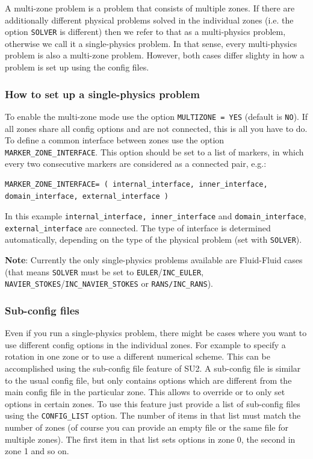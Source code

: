 \documentclass[12pt, a4paper, twoside]{article}
\begin{document}
A multi-zone problem is a problem that consists of multiple zones. If there are additionally different physical problems solved in the individual zones (i.e. the option \verb|SOLVER| is different) then we refer to that as a multi-physics problem, otherwise we call it a single-physics problem. In that sense, every multi-physics problem is also a multi-zone problem. However, both cases differ slighty in how a problem is set up using the config files.

\subsubsection{How to set up a single-physics problem}

To enable the multi-zone mode use the option \verb|MULTIZONE = YES| (default is \verb|NO|). If all zones share all config options and are not connected, this is all you have to do. To define a common interface between zones use the option \verb|MARKER_ZONE_INTERFACE|. This option should be set to a list of markers, in which every two consecutive markers are considered as a connected pair, e.g.:

\begin{lstlisting}
MARKER_ZONE_INTERFACE= ( internal_interface, inner_interface, domain_interface, external_interface )
\end{lstlisting}


In this example \verb|internal_interface, inner_interface| and \verb|domain_interface|,\\ \verb|external_interface| are connected. The type of interface is determined automatically, depending on the type of the physical problem (set with \verb|SOLVER|).

\textbf{Note}: Currently the only single-physics problems available are Fluid-Fluid cases (that means \verb|SOLVER| must be set to \verb|EULER|/\verb|INC_EULER|, \verb|NAVIER_STOKES|/\texttt{INC\_NAVIER\_STOKES} or \verb|RANS/INC_RANS|).

\subsubsection{Sub-config files}

Even if you run a single-physics problem, there might be cases where you want to use different config options in the individual zones. For example to specify a rotation in one zone or to use a different numerical scheme. This can be accomplished using the sub-config file feature of SU2. A sub-config file is similar to the usual config file, but only contains options which are different from the main config file in the particular zone. This allows to override or to only set options in certain zones. To use this feature just provide a list of sub-config files using the \verb|CONFIG_LIST| option. The number of items in that list must match the number of zones (of course you can provide an empty file or the same file for multiple zones). The first item in that list sets options in zone 0, the second in zone 1 and so on.
\end{document}
